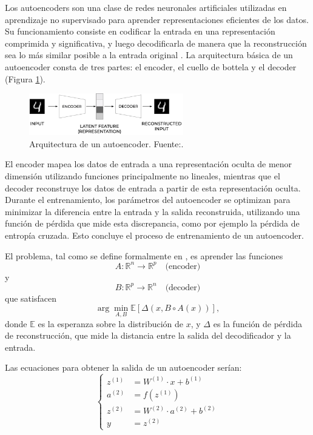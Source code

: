 Los autoencoders son una clase de redes neuronales artificiales utilizadas en aprendizaje no supervisado para aprender representaciones eficientes de los datos. Su funcionamiento consiste en codificar la entrada en una representación comprimida y significativa, y luego decodificarla de manera que la reconstrucción sea lo más similar posible a la entrada original \citep{lopes2022effective}. La arquitectura básica de un autoencoder consta de tres partes: el encoder, el cuello de bottela y el decoder (Figura \ref{fig:AE_architecture}). 

\begin{figure}[h]
    \centering
    \includegraphics[width=0.6\textwidth]{img/AE4.png}
    \caption{Arquitectura de un autoencoder. Fuente:\citep{autoencoderImage}.}
    \label{fig:AE_architecture}
\end{figure}

El encoder mapea los datos de entrada a una representación oculta de menor dimensión utilizando funciones principalmente no lineales, mientras que el decoder reconstruye los datos de entrada a partir de esta representación oculta. Durante el entrenamiento, los parámetros del autoencoder se optimizan para minimizar la diferencia entre la entrada y la salida reconstruida, utilizando una función de pérdida que mide esta discrepancia, como por ejemplo la pérdida de entropía cruzada. Esto concluye el proceso de entrenamiento de un autoencoder.


El problema, tal como se define formalmente en \cite{bank2023autoencoders}, es aprender las funciones
\[
A : \mathbb{R}^n \rightarrow \mathbb{R}^p \quad \text{(encoder)}
\]
y
\[
B : \mathbb{R}^p \rightarrow \mathbb{R}^n \quad \text{(decoder)}
\]
que satisfacen
\[
\arg \min_{A, B} \mathbb{E}[\Delta(x, B \circ A(x))],
\]
donde $\mathbb{E}$ es la esperanza sobre la distribución de $x$, y $\Delta$ es la función de pérdida de reconstrucción, que mide la distancia entre la salida del decodificador y la entrada.


Las ecuaciones para obtener la salida de un autoencoder serían:
\[
\left\{
\begin{aligned}
z^{(1)} &= W^{(1)} \cdot x + b^{(1)} \\
a^{(2)} &= f(z^{(1)})  \\
z^{(2)} &= W^{(2)} \cdot a^{(2)} + b^{(2)}  \\
y &= z^{(2)} 
\end{aligned}
\right.
\]


